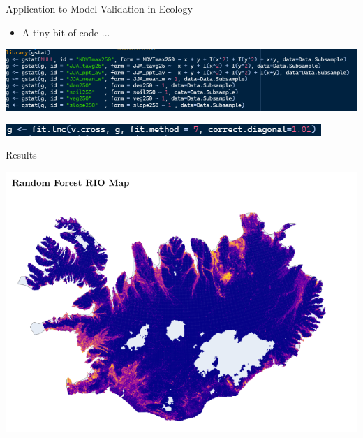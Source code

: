 \documentclass[10pt]{beamer}
\begin{document}
\begin{frame}{Application to Model Validation in Ecology}
    \begin{itemize}
        \item A tiny bit of code ...
    \end{itemize}
    \begin{center}
        \includegraphics[width = \textwidth]{Code1.png}
    \end{center}
    \begin{center}
        \includegraphics[width = \textwidth]{Code2.png}
    \end{center}
\end{frame}


\begin{frame}{Results}
    \begin{center}
    \includegraphics[width = .9\textwidth]{randomforest.png}
    \end{center}
\end{frame}
\end{document}
